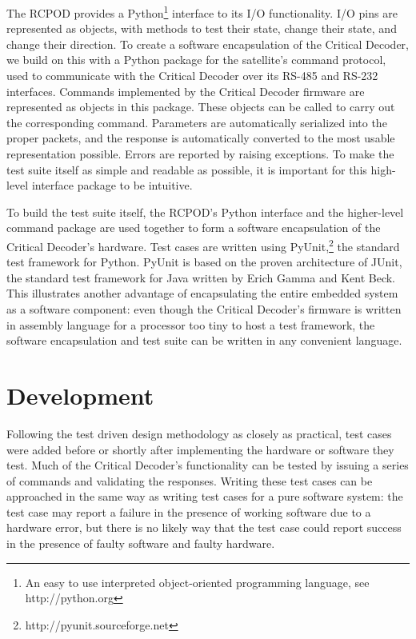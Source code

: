 \documentclass[letterpaper]{article}
\begin{document}
The RCPOD provides a Python\footnote{An easy to use interpreted object-oriented programming language, see http://python.org}
interface to its I/O functionality. I/O pins are represented as objects, with methods to test their state, change
their state, and change their direction. To create a software encapsulation of the Critical Decoder, we build on this
with a Python package for the satellite's command protocol, used to communicate with the Critical Decoder over
its RS-485 and RS-232 interfaces. Commands implemented by the Critical Decoder firmware
are represented as objects in this package. These objects can be called to carry out the corresponding command.
Parameters are automatically serialized into the proper packets, and the response is automatically
converted to the most usable representation possible. Errors are reported by raising exceptions. To
make the test suite itself as simple and readable as possible, it is important for this high-level interface package to be
intuitive.

To build the test suite itself, the RCPOD's Python interface and the higher-level command package are
used together to form a software encapsulation of the Critical Decoder's hardware. Test cases are written
using PyUnit,\footnote{http://pyunit.sourceforge.net} the standard test framework for Python. PyUnit is based
on the proven architecture of JUnit, the standard test framework for Java written by Erich Gamma and Kent Beck.
This illustrates another advantage of encapsulating the entire embedded system as a software component: even
though the Critical Decoder's firmware is written in assembly language for a processor too tiny to host a
test framework, the software encapsulation and test suite can be written in any convenient language.

\section{Development}

Following the test driven design methodology as closely as practical, test cases were added before or shortly
after implementing the hardware or software they test. Much of the Critical Decoder's functionality can be tested by issuing
a series of commands and validating the responses. Writing these test cases can be approached in the same way
as writing test cases for a pure software system: the test case may report a failure in the presence of working
software due to a hardware error, but there is no likely way that the test case could report success in the
presence of faulty software and faulty hardware.
\end{document}
